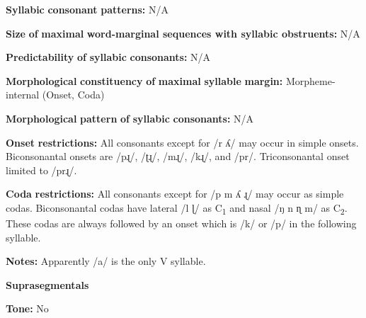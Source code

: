 \begin{styleBody}
\textbf{Syllabic} \textbf{consonant} \textbf{patterns:} N/A
\end{styleBody}

\begin{styleBody}
\textbf{Size} \textbf{of} \textbf{maximal} \textbf{word{}-marginal sequences with syllabic obstruents:} N/A
\end{styleBody}

\begin{styleBody}
\textbf{Predictability} \textbf{of} \textbf{syllabic} \textbf{consonants:} N/A
\end{styleBody}

\begin{styleBody}
\textbf{Morphological} \textbf{constituency} \textbf{of} \textbf{maximal} \textbf{syllable} \textbf{margin:} Morpheme-internal (Onset, Coda)
\end{styleBody}

\begin{styleBody}
\textbf{Morphological} \textbf{pattern} \textbf{of} \textbf{syllabic} \textbf{consonants:} N/A
\end{styleBody}

\begin{styleBody}
\textbf{Onset} \textbf{restrictions:} All consonants except for /r ʎ/ may occur in simple onsets. Biconsonantal onsets are /pɻ/, /ʈɻ/, /mɻ/, /kɻ/, and /pr/. Triconsonantal onset limited to /prɻ/.
\end{styleBody}

\begin{styleBody}
\textbf{Coda} \textbf{restrictions:} All consonants except for /p m ʎ ɻ/ may occur as simple codas. Biconsonantal codas have lateral /l ɭ/ as C\textsubscript{1} and nasal /ŋ n ɳ m/ as C\textsubscript{2}. These codas are always followed by an onset which is /k/ or /p/ in the following syllable.
\end{styleBody}

\begin{styleBody}
\textbf{Notes:} Apparently /a/ is the only V syllable.
\end{styleBody}

\begin{styleBody}
\textbf{Suprasegmentals}
\end{styleBody}

\begin{styleBody}
\textbf{Tone:} No
\end{styleBody}

